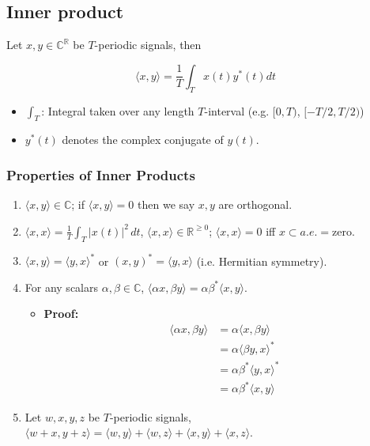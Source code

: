 \subsection{Inner product}
\begin{definition}
    Let \( x, y \in \mathbb{C}^{\mathbb{R}} \) be \( T \)-periodic signals, then
    
    \[
    \langle x, y \rangle = \frac{1}{T} \int_T x(t) y^*(t) dt
    \]
    \begin{itemize}
        \item $\int_T$: Integral taken over any length \( T \)-interval (e.g. $[0,T)$, $[-T/2,T/2)$)
        \item \( y^*(t) \) denotes the complex conjugate of \( y(t) \).
    \end{itemize}
\end{definition}

\subsubsection{Properties of Inner Products}
\begin{definition}
    \begin{enumerate}
        \item $\langle x, y \rangle \in \mathbb{C}$; if $\langle x, y \rangle = 0$ then we say $x, y$ are orthogonal.
        \item $\langle x, x \rangle = \frac{1}{T} \int_T |x(t)|^2 \, dt$, \quad $\langle x, x \rangle \in \mathbb{R}^{\geq 0}$; \quad $\langle x, x \rangle = 0$ iff $x \subset{a.e.}{=} \text{zero}$.
        \item $\langle x, y \rangle = \langle y, x \rangle^*$ \quad or \quad $(x, y)^* = \langle y, x \rangle$ \quad (i.e. Hermitian symmetry).
        \item For any scalars $\alpha, \beta \in \mathbb{C}$, \quad $\langle \alpha x, \beta y \rangle = \alpha \beta^* \langle x, y \rangle$.
        \begin{itemize}
            \item \textbf{Proof:}
            \begin{align*}
                \langle \alpha x, \beta y \rangle &= \alpha \langle x, \beta y \rangle \\
                &= \alpha \langle \beta y, x \rangle^* \\
                &= \alpha \beta^* \langle y, x \rangle^* \\
                &= \alpha \beta^* \langle x, y \rangle
            \end{align*}
        \end{itemize}
        \item Let $w, x, y, z$ be $T$-periodic signals, $\langle w + x, y + z \rangle = \langle w, y \rangle + \langle w, z \rangle + \langle x, y \rangle + \langle x, z \rangle$.
    \end{enumerate}    
\end{definition}

